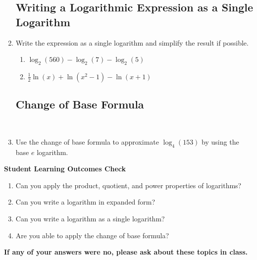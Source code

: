 \begin{enumerate}
\clearpage

\subsection{Writing a Logarithmic Expression as a Single Logarithm}

\item Write the expression as a single logarithm and simplify the result if possible.
\begin{enumerate}
\item $\log_2\left(560\right) - \log_2\left(7\right)- \log_2\left(5\right)$
  \vfill
\item $\frac{1}{2} \ln\left(x\right) + \ln \left( x^2-1 \right)-
  \ln(x+1)$
  \vfill
\end{enumerate}



\subsection{Change of Base Formula} ~

\noindent
{}

\item Use the change of base formula to approximate
  $\log_4\left(153\right)$ by using the base $e$ logarithm.
  \vfill

\end{enumerate}

\noindent \textbf{Student Learning Outcomes Check}

\begin{enumerate}
\item Can you apply the product, quotient, and power properties of logarithms?
\item Can you write a logarithm in expanded form?
\item Can you write a logarithm as a single logarithm?
\item Are you able to apply the change of base formula?
\end{enumerate}

\noindent \textbf{If any of your answers were no, please ask about these topics in class.}


